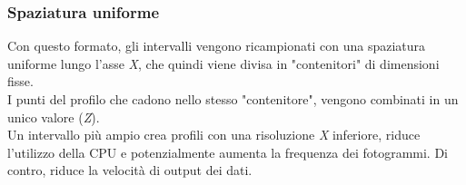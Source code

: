 \subsubsection{Spaziatura uniforme}
Con questo formato, gli intervalli vengono ricampionati con una spaziatura uniforme lungo l'asse \textit{X}, che quindi viene divisa in "contenitori" di dimensioni fisse.\\
\newline
I punti del profilo che cadono nello stesso "contenitore", vengono combinati in un unico valore (\textit{Z}).\\
\newline
Un intervallo più ampio crea profili con una risoluzione \textit{X} inferiore, riduce l'utilizzo della CPU e potenzialmente aumenta la frequenza dei fotogrammi. Di contro, riduce la velocità di output dei dati.\\

